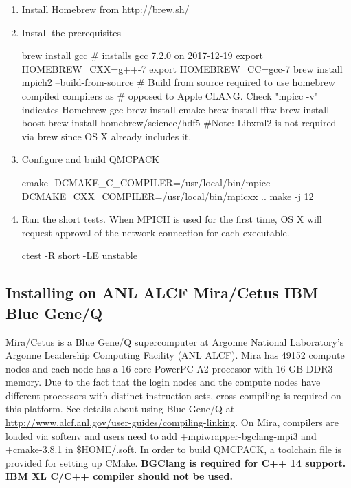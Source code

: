 \begin{enumerate}
\item Install Homebrew from \url{http://brew.sh/}
%
 
\item Install the prerequisites
%
\begin{shade}
brew install gcc # installs gcc 7.2.0 on 2017-12-19
export HOMEBREW_CXX=g++-7
export HOMEBREW_CC=gcc-7
brew install mpich2 --build-from-source
# Build from source required to use homebrew compiled compilers as
# opposed to Apple CLANG. Check "mpicc -v" indicates Homebrew gcc
brew install cmake
brew install fftw
brew install boost
brew install homebrew/science/hdf5
#Note: Libxml2 is not required via brew since OS X already includes it.
\end{shade}
\item Configure and build QMCPACK
%
\begin{shade}
cmake -DCMAKE_C_COMPILER=/usr/local/bin/mpicc \
      -DCMAKE_CXX_COMPILER=/usr/local/bin/mpicxx ..
make -j 12
\end{shade}
\item Run the short tests. When MPICH is used for the first time, OS
  X will request approval of the network connection for each executable.
%
\begin{shade}
ctest -R short -LE unstable
\end{shade}
\end{enumerate}

\subsection{Installing on ANL ALCF Mira/Cetus IBM Blue Gene/Q}
\label{sec:buildbgq}
Mira/Cetus is a Blue Gene/Q supercomputer at Argonne National Laboratory's Argonne Leadership Computing Facility (ANL ALCF).
Mira has 49152 compute nodes and each node has a 16-core PowerPC A2 processor with 16 GB DDR3 memory.
Due to the fact that the login nodes and the compute nodes have different processors with distinct instruction sets,
cross-compiling is required on this platform. See details about using Blue Gene/Q at \url{http://www.alcf.anl.gov/user-guides/compiling-linking}.
On Mira, compilers are loaded via softenv and users need to add +mpiwrapper-bgclang-mpi3 and +cmake-3.8.1 in \$HOME/.soft.
In order to build QMCPACK, a toolchain file is provided for setting up CMake.
\textbf{BGClang is required for C++ 14 support. IBM XL C/C++ compiler should not be used.}

